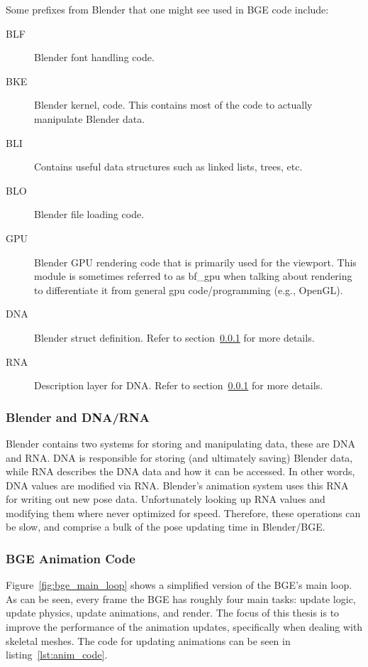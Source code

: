 Some prefixes from Blender that one might see used in BGE code include:

\begin{description}
 \item [BLF] Blender font handling code.
 \item [BKE] Blender kernel, code. This contains most of the code to actually manipulate Blender data.
 \item [BLI] Contains useful data structures such as linked lists, trees, etc.
 \item [BLO] Blender file loading code.
 \item [GPU] Blender GPU rendering code that is primarily used for the viewport. This module is sometimes referred to as bf\_gpu when talking about rendering to differentiate it from general gpu code/programming (e.g., OpenGL).
 \item [DNA] Blender struct definition. Refer to section~\ref{sec:bf_dna_rna} for more details.
 \item [RNA] Description layer for DNA. Refer to section~\ref{sec:bf_dna_rna} for more details.
\end{description}

\subsubsection{Blender and DNA/RNA}
\label{sec:bf_dna_rna}

Blender contains two systems for storing and manipulating data, these are DNA and RNA. DNA is responsible for storing (and ultimately saving) Blender data, while RNA describes the DNA data and how it can be accessed. In other words, DNA values are modified via RNA. Blender's animation system uses this RNA for writing out new pose data. Unfortunately looking up RNA values and modifying them where never optimized for speed. Therefore, these operations can be slow, and comprise a bulk of the pose updating time in Blender/BGE. 


\subsubsection{BGE Animation Code}
\label{sec:bge_overview}


Figure~\ref{fig:bge_main_loop} shows a simplified version of the BGE's main loop. As can be seen, every frame the BGE has roughly four main tasks: update logic, update physics, update animations, and render. The focus of this thesis is to improve the performance of the animation updates, specifically when dealing with skeletal meshes. The code for updating animations can be seen in listing~\ref{lst:anim_code}.

